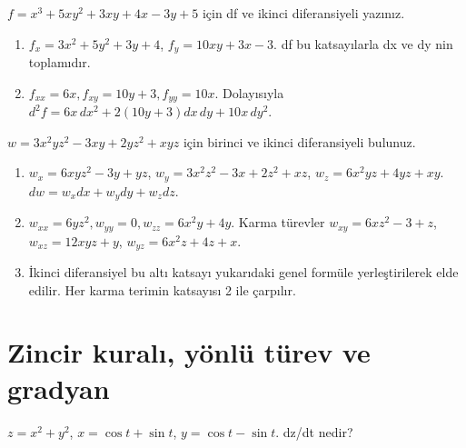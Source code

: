 \begin{tcolorbox}[title={Örnek 5.13 | Tahtadaki polinom diferansiyeli},colframe=accent]\(f=x^3+5xy^2+3xy+4x-3y+5\) için df ve ikinci diferansiyeli yazınız.
\par{}\end{tcolorbox}
\begin{tcolorbox}[title={Adım adım çözüm},colback=green!3!white,colframe=green]\begin{enumerate}
\item \(f_x=3x^2+5y^2+3y+4\), \(f_y=10xy+3x-3\). df bu katsayılarla dx ve dy nin toplamıdır.
\item \(f_{xx}=6x,f_{xy}=10y+3,f_{yy}=10x\). Dolayısıyla \(d^2f=6x\,dx^2+2(10y+3)dx\,dy+10x\,dy^2\).
\end{enumerate}\end{tcolorbox}
\begin{tcolorbox}[title={Örnek 5.14 | Üç değişkenli polinomun diferansiyelleri},colframe=accent]\(w=3x^2yz^2-3xy+2yz^2+xyz\) için birinci ve ikinci diferansiyeli bulunuz.
\par{}\end{tcolorbox}
\begin{tcolorbox}[title={Adım adım çözüm},colback=green!3!white,colframe=green]\begin{enumerate}
\item \(w_x=6xyz^2-3y+yz\), \(w_y=3x^2z^2-3x+2z^2+xz\), \(w_z=6x^2yz+4yz+xy\). \(dw=w_xdx+w_ydy+w_zdz\).
\item \(w_{xx}=6yz^2,w_{yy}=0,w_{zz}=6x^2y+4y\). Karma türevler \(w_{xy}=6xz^2-3+z\), \(w_{xz}=12xyz+y\), \(w_{yz}=6x^2z+4z+x\).
\item İkinci diferansiyel bu altı katsayı yukarıdaki genel formüle yerleştirilerek elde edilir. Her karma terimin katsayısı 2 ile çarpılır.
\end{enumerate}\end{tcolorbox}
\clearpage\section{Zincir kuralı, yönlü türev ve gradyan}
\begin{tcolorbox}[title={Örnek 6.1 | Tahtadaki trigonometrik zincir örneği},colframe=accent]\(z=x^2+y^2\), \(x=\cos t+\sin t\), \(y=\cos t-\sin t\). dz/dt nedir?
\par{}\end{tcolorbox}
